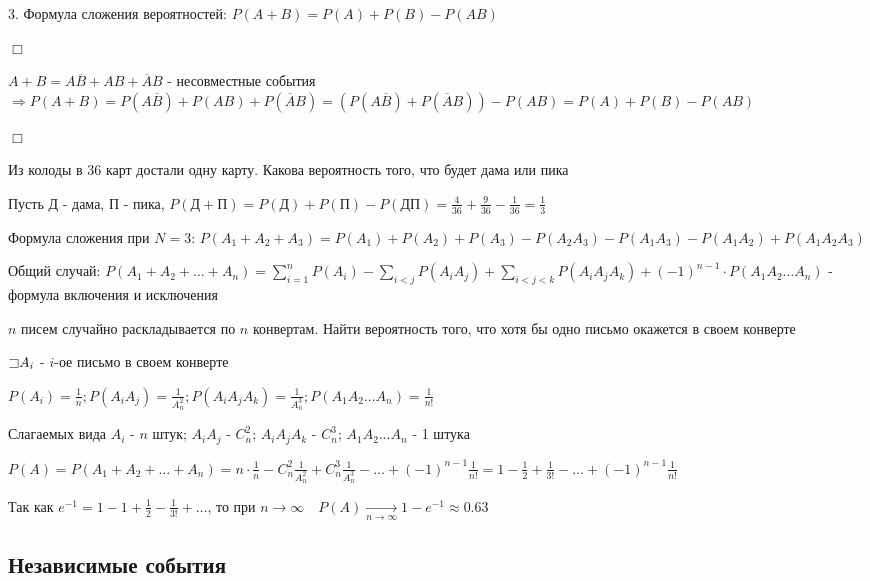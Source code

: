\documentclass[12pt]{article}
\begin{document}
    3. Формула сложения вероятностей: $P(A + B) = P(A) + P(B) - P(AB)$

    \begin{tcolorbox}
        $\Box$

        $A + B = A\overline{B} + AB + \overline{A}B$ - несовместные события $\Longrightarrow P(A + B) = P(A\overline{B}) + P(AB) + P(\overline{A}B) =
        (P(A\overline{B}) + P(\overline{A}B)) - P(AB) = P(A) + P(B) - P(AB)$

        $\Box$
    \end{tcolorbox}

    \Ex Из колоды в 36 карт достали одну карту. Какова вероятность того, что будет дама или пика

    Пусть Д - дама, П - пика, $P(\text{Д} + \text{П}) = P(\text{Д}) + P(\text{П}) - P(\text{Д}\text{П}) = \frac{4}{36} + \frac{9}{36} - \frac{1}{36} = \frac{1}{3}$

    Формула сложения при $N = 3$: $P(A_1 + A_2 + A_3) = P(A_1) + P(A_2) + P(A_3) - P(A_2 A_3) - P(A_1 A_3) - P(A_1 A_2) + P(A_1 A_2 A_3)$

    Общий случай: $P(A_1 + A_2 + \dots + A_n) =  \sum_{i = 1}^n P(A_i) - \sum_{i < j} P(A_i A_j) + \sum_{i < j < k} P(A_i A_j A_k) + (-1)^{n - 1} \cdot P(A_1 A_2 \dots A_n)$ - формула включения и исключения

    \Ex $n$ писем случайно раскладывается по $n$ конвертам. Найти вероятность того, что хотя бы одно письмо окажется в своем конверте

    $\mathord{\sqsupset} A_i$ - $i$-ое письмо в своем конверте

    $P(A_i) = \frac{1}{n}; P(A_i A_j) = \frac{1}{A^2_n}; P(A_i A_j A_k) = \frac{1}{A^3_n}; P(A_1 A_2 \dots A_n) = \frac{1}{n!}$

    Слагаемых вида $A_i$ - $n$ штук; $A_i A_j$ - $C^2_n$; $A_i A_j A_k$ - $C^3_n$; $A_1 A_2 \dots A_n$ - 1 штука

    $P(A) = P(A_1 + A_2 + \dots + A_n) = n \cdot \frac{1}{n} - C^2_n \frac{1}{A^2_n} + C^3_n \frac{1}{A^3_n} - \dots + (-1)^{n - 1} \frac{1}{n!} = 1 - \frac{1}{2} + \frac{1}{3!} - \dots + (-1)^{n - 1} \frac{1}{n!}$

    Так как $e^{-1} = 1 - 1 + \frac{1}{2} - \frac{1}{3!} + \dots$, то при $n \to \infty \quad P(A) \underset{n \to \infty}{\to} 1 - e^{-1} \approx 0.63$

    \subsection{Независимые события}
\end{document}
